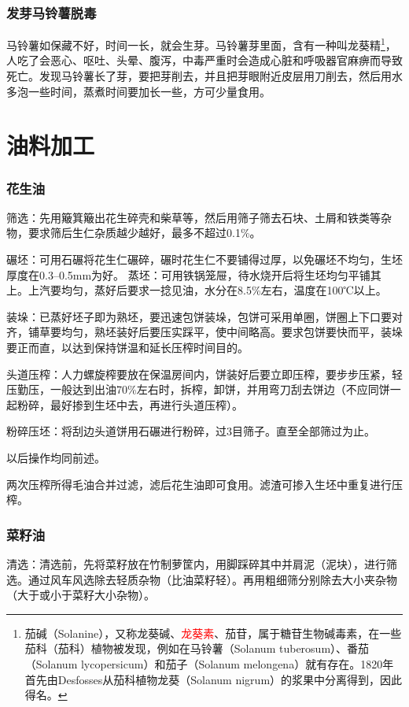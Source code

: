 \documentclass{ctexbook}
\begin{document}
\subsection{发芽马铃薯脱毒}
马铃薯如保藏不好，时间一长，就会生芽。马铃薯芽里面，含有一种叫龙葵精\footnote{茄碱（Solanine），又称龙葵碱、\textcolor{red}{龙葵素}、茄苷，属于糖苷生物碱毒素，在一些茄科（茄科）植物被发现，例如在马铃薯（Solanum tuberosum）、番茄（Solanum lycopersicum）和茄子（Solanum melongena）就有存在。1820年首先由Desfosses从茄科植物龙葵（Solanum nigrum）的浆果中分离得到，因此得名。}，人吃了会恶心、呕吐、头晕、腹泻，中毒严重时会造成心脏和呼吸器官麻痹而导致死亡。发现马铃薯长了芽，要把芽削去，并且把芽眼附近皮层用刀削去，然后用水多泡一些时间，蒸煮时间要加长一些，方可少量食用。
\chapter{油料加工}
\subsection{花生油}
筛选：先用簸箕簸出花生碎壳和柴草等，然后用筛子筛去石块、土屑和铁类等杂物，要求筛后生仁杂质越少越好，最多不超过0.1\%。

碾坯：可用石碾将花生仁碾碎，碾时花生仁不要铺得过厚，以免碾坯不均匀，生坯厚度在0.3--0.5mm为好。
蒸坯：可用铁锅笼屉，待水烧开后将生坯均匀平铺其上。上汽要均匀，蒸好后要求一捻见油，水分在8.5\%左右，温度在100℃以上。

装垛：已蒸好坯子即为熟坯，要迅速包饼装垛，包饼可采用单圈，饼圈上下口要对齐，铺草要均匀，熟坯装好后要压实踩平，使中间略高。要求包饼要快而平，装垛要正而直，以达到保持饼温和延长压榨时间目的。

头道压榨：人力螺旋榨要放在保温房间内，饼装好后要立即压榨，要步步压紧，轻压勤压，一般达到出油70\%左右时，拆榨，卸饼，并用弯刀刮去饼边（不应同饼一起粉碎，最好掺到生坯中去，再进行头道压榨）。

粉碎压坯：将刮边头道饼用石碾进行粉碎，过3目筛子。直至全部筛过为止。

以后操作均同前述。

两次压榨所得毛油合并过滤，滤后花生油即可食用。滤渣可掺入生坯中重复进行压榨。
\subsection{菜籽油}
清选：清选前，先将菜籽放在竹制萝筐内，用脚踩碎其中并肩泥（泥块），进行筛选。通过风车风选除去轻质杂物（比油菜籽轻）。再用粗细筛分别除去大小夹杂物（大于或小于菜籽大小杂物）。
\end{document}
